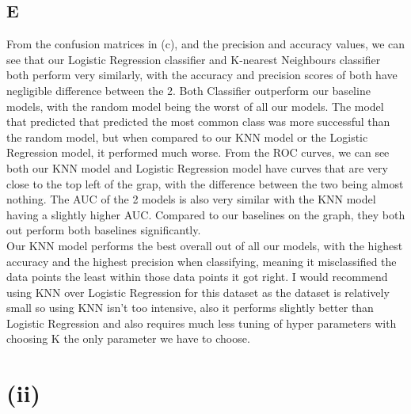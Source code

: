 \documentclass[11pt]{article} %
\begin{document}
\subsection{E}
From the confusion matrices in (c), and the precision and accuracy values, we can see that our Logistic Regression classifier and K-nearest Neighbours classifier both perform very similarly, with the accuracy and precision scores of both have negligible difference between the 2. Both Classifier outperform our baseline models, with the random model being the worst of all our models. The model that predicted that predicted the most common class was more successful than the random model, but when compared to our KNN model or the Logistic Regression model, it performed much worse. From the ROC curves, we can see both our KNN model and Logistic Regression model have curves that are very close to the top left of the grap, with the difference between the two being almost nothing. The AUC of the 2 models is also very similar with the KNN model having a slightly higher AUC. Compared to our baselines on the graph, they both out perform both baselines significantly. \\
Our KNN model performs the best overall out of all our models, with the highest accuracy and the highest precision when classifying, meaning it misclassified the data points the least within those data points it got right. I would recommend using KNN over Logistic Regression for this dataset as the dataset is relatively small so using KNN isn't too intensive, also it performs slightly better than Logistic Regression and also requires much less tuning of hyper parameters with choosing K the only parameter we have to choose.
\newpage
\section{(ii)}
\end{document}
